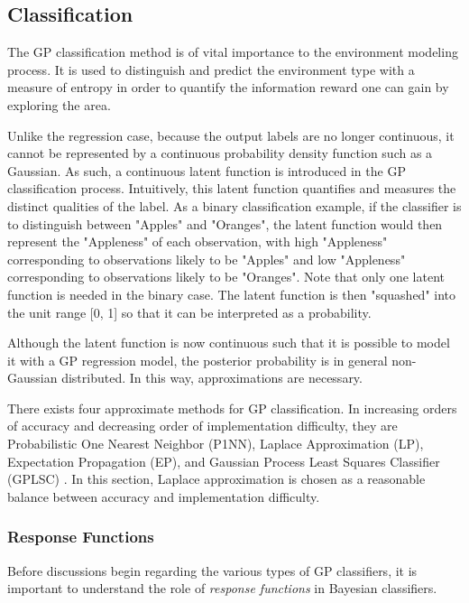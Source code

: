 		\subsection{Classification}
		\label{Background:GaussianProcesses:Classification}
		
			The GP classification method is of vital importance to the environment modeling process. It is used to distinguish and predict the environment type with a measure of entropy in order to quantify the information reward one can gain by exploring the area.
			
			Unlike the regression case, because the output labels are no longer continuous, it cannot be represented by a continuous probability density function such as a Gaussian. As such, a continuous latent function is introduced in the GP classification process. Intuitively, this latent function quantifies and measures the distinct qualities of the label. As a binary classification example, if the classifier is to distinguish between "Apples" and "Oranges", the latent function would then represent the "Appleness" of each observation, with high "Appleness" corresponding to observations likely to be "Apples" and low "Appleness" corresponding to observations likely to be "Oranges". Note that only one latent function is needed in the binary case. The latent function is then "squashed" into the unit range [0, 1] so that it can be interpreted as a probability.
			
			Although the latent function is now continuous such that it is possible to model it with a GP regression model, the posterior probability is in general non-Gaussian distributed. In this way, approximations are necessary.
			
			There exists four approximate methods for GP classification. In increasing orders of accuracy and decreasing order of implementation difficulty, they are Probabilistic One Nearest Neighbor (P1NN), Laplace Approximation (LP), Expectation Propagation (EP), and Gaussian Process Least Squares Classifier (GPLSC) \citep{GaussianProcessForMachineLearning}. In this section, Laplace approximation is chosen as a reasonable balance between accuracy and implementation difficulty.
			
			\subsubsection{Response Functions}
			
				Before discussions begin regarding the various types of GP classifiers, it is important to understand the role of \textit{response functions} in Bayesian classifiers.
				
